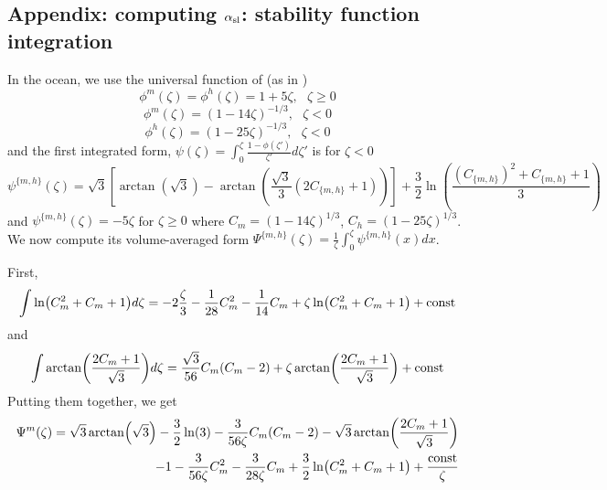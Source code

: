 \begin{subappendices}
\section{Appendix: computing $\alpha_{\rm sl}$: stability function integration}
\label{sec:ND_Ocean_stabilityFunctionIntegration}
In the ocean, we use the universal function of \citep{large_similarity_2019} (as in \citep{pelletier_two-sided_2021})
\begin{equation}
	\phi^m(\zeta) = \phi^h(\zeta) = 1+5\zeta, ~~~ \zeta \geq 0
\end{equation}
\begin{equation}
	\phi^m(\zeta) = (1-14\zeta)^{-1/3}, ~~~ \zeta < 0
\end{equation}
\begin{equation}
	\phi^h(\zeta) = (1-25\zeta)^{-1/3}, ~~~ \zeta < 0
\end{equation}
and the first integrated form, $\psi(\zeta)= \int_0^\zeta \frac{1-\phi(\zeta')}{\zeta'}d\zeta'$ is for $\zeta<0$
\begin{equation}
	\psi^{\{m,h\}}(\zeta)  = \sqrt{3}\left[\arctan(\sqrt{3}) -
	\arctan\left(\frac{\sqrt{3}}{3}(2C_{\{m,h\}}+1)\right)\right]
	+ \frac{3}{2}\ln \left(\frac{(C_{\{m,h\}})^2 + C_{\{m,h\}} + 1}{3}\right)
\end{equation}
and $\psi^{\{m,h\}}(\zeta) = -5\zeta$ for $\zeta \geq 0$
where $C_m = (1-14\zeta)^{1/3}$, $C_h = (1-25\zeta)^{1/3}$.
We now compute its volume-averaged form $\Psi^{\{m,h\}}(\zeta)= \frac{1}{\zeta}\int_0^\zeta \psi^{\{m,h\}}(x)dx$.
\par
First,
\begin{equation}
	\int \ln (C_m^2+C_m+1)d\zeta
	= -2 \frac{\zeta}{3} - \frac{1}{28}C_m^2 - \frac{1}{14}C_m
	+\zeta\ln (C_m^2+C_m+1) + {\rm const}
\end{equation}
and
\begin{equation}
	\int \arctan (\frac{2C_m+1}{\sqrt{3}})d\zeta
	= \frac{\sqrt{3}}{56}C_m(C_m-2)
	+ \zeta \arctan (\frac{2C_m+1}{\sqrt{3}}) + {\rm const}
\end{equation}
Putting them together, we get
\begin{equation}
\begin{aligned}
	\Psi^m(\zeta)=\sqrt{3}\arctan(\sqrt{3})- 
	\frac{3}{2}\ln(3) -
	\frac{3}{56\zeta}C_m(C_m-2)
	- \sqrt{3} \arctan (\frac{2C_m+1}{\sqrt{3}})
	\\
	-1 - \frac{3}{56\zeta}C_m^2 - \frac{3}{28\zeta}C_m
	+\frac{3}{2}\ln (C_m^2+C_m+1)
	+ \frac{{\rm const}}{\zeta}

\end{aligned}
\end{equation}
\end{subappendices}

